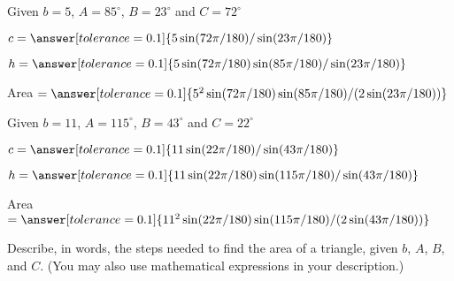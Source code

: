 \documentclass[number]{ximera}
\begin{document}
\begin{problem}
Given $b = 5$, $A = 85^\circ$, $B = 23^\circ$ and $C = 72^\circ$

$c=\answer[tolerance=0.1]{5\sin(72\pi/180)/\sin(23\pi/180)}$

$h=\answer[tolerance=0.1]{5\sin(72\pi/180)\sin(85\pi/180)/\sin(23\pi/180)}$

Area $=\answer[tolerance=0.1]{5^2\sin(72\pi/180)\sin(85\pi/180)/(2\sin(23\pi/180))}$
\end{problem}

\begin{problem}
Given $b = 11$, $A = 115^\circ$, $B = 43^\circ$ and $C = 22^\circ$

$c=\answer[tolerance=0.1]{11\sin(22\pi/180)/\sin(43\pi/180)}$

$h=\answer[tolerance=0.1]{11\sin(22\pi/180)\sin(115\pi/180)/\sin(43\pi/180)}$

Area $=\answer[tolerance=0.1]{11^2\sin(22\pi/180)\sin(115\pi/180)/(2\sin(43\pi/180))}$
\end{problem}

\begin{question} 
Describe, in words, the steps needed to find the area of a triangle, given $b$, $A$, $B$, and $C$. (You may also use mathematical expressions in your description.)
\begin{freeResponse}
\end{freeResponse}
\end{question}
\end{document}
